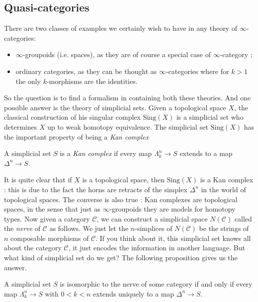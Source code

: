 \begin{refsection}
\section{Quasi-categories}

There are two classes of examples we certainly wish to have in any theory of $\infty$-categories:
\begin{itemize}
\item $\infty$-groupoids (i.e. spaces), as they are of course a special case of $\infty$-category ;
\item ordinary categories, as they can be thought as $\infty$-categories where for $k >1$ the only $k$-morphisms are the identities.
\end{itemize}

So the question is to find a formalism in containing both these theories. And one possible answer is the theory of simplicial sets. Given a topological space $X$, the classical construction of his singular complex $\text{Sing}(X)$ is a simplicial set who determines $X$ up to weak homotopy equivalence. The simplicial set $\text{Sing}(X)$ has the important property of being a \emph{Kan complex}

\begin{defin}
A simplicial set $S$ is a \emph{Kan complex} if every map $\Lambda_k^n \to S$ extends to a map $\Delta^n \to S$.
\end{defin}

It is quite clear that if $X$ is a topological space, then $\text{Sing}(X)$ is a Kan complex : this is due to the fact the horns are retracts of the simplex $\Delta^n$ in the world of topological spaces. The converse is also true : Kan complexes are topological spaces, in the sense that just as $\infty$-groupoids they are models for homotopy types.
Now given a category $\mathcal C$, we can construct a simplicial space $N(\mathcal C)$ called the \emph{nerve} of $\mathcal C$ as follows. We just let the $n$-simplices of $N(\mathcal C)$ be the strings of $n$ composable morphisms of $\mathcal C$. If you think about it, this simplicial set knows all about the category $\mathcal C$, it just encodes the information in another language. But what kind of simplicial set do we get? The following proposition gives us the answer.

\begin{prop}
A simplicial set $S$ is isomorphic to the nerve of some category if and only if every map $\Lambda_k^n \to S$ with $0<k<n$ extends uniquely to a map $\Delta^n \to S$.
\end{prop}


\end{refsection}
